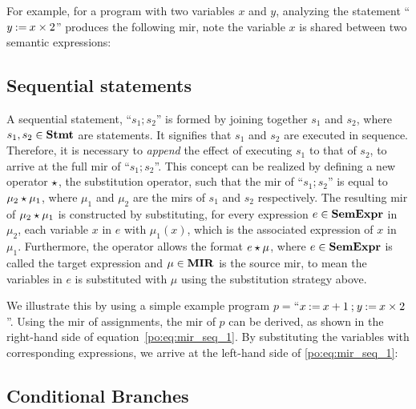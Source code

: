 For example, for a program with two variables $x$ and $y$, analyzing the
statement ``$y \mathbin{:=} x \times 2$'' produces the following \gls{mir}\@, note
the variable $x$ is shared between two semantic expressions:

\subsection{Sequential statements}
\label{po:sub:sequential_statements}

A sequential statement, ``$s_1 \semicolon s_2$'' is formed by joining together
$s_1$ and $s_2$, where $s_1, s_2 \in \mathbf{Stmt}$ are statements.  It signifies
that $s_1$ and $s_2$ are executed in sequence.  Therefore, it is necessary to
\emph{append} the effect of executing $s_1$ to that of $s_2$, to arrive at the
full \gls{mir} of ``$s_1 \semicolon s_2$''.  This concept can be realized by
defining a new operator $\mathbin{\star}$, the substitution operator, such that the
\gls{mir} of ``$s_1 \semicolon s_2$'' is equal to $\mu_2 \mathbin{\star} \mu_1$, where
$\mu_1$ and $\mu_2$ are the \glspl{mir} of $s_1$ and $s_2$ respectively.  The
resulting \gls{mir} of $\mu_2 \mathbin{\star} \mu_1$ is constructed by substituting,
for every expression $e \in \mathbf{SemExpr}$ in $\mu_2$, each variable $x$ in
$e$ with $\mu_1(x)$, which is the associated expression of $x$ in $\mu_1$.
Furthermore, the operator allows the format $e \mathbin{\star} \mu$, where $e \in
\mathbf{SemExpr}$ is called the target expression and $\mu \in \mathbf{MIR}$ is the source
\gls{mir}, to mean the variables in $e$ is substituted with $\mu$ using the
substitution strategy above.

We illustrate this by using a simple example program $p = {}$``$x \mathbin{:=} x
+ 1 \mathbin{;} y \mathbin{:=} x \times 2$''.  Using the \gls{mir} of assignments,
the \gls{mir} of $p$ can be derived, as shown in the right-hand side
of equation~\eqref{po:eq:mir_seq_1}.  By substituting the variables
with corresponding expressions, we arrive at the left-hand side of
\eqref{po:eq:mir_seq_1}:

\subsection{Conditional Branches}

